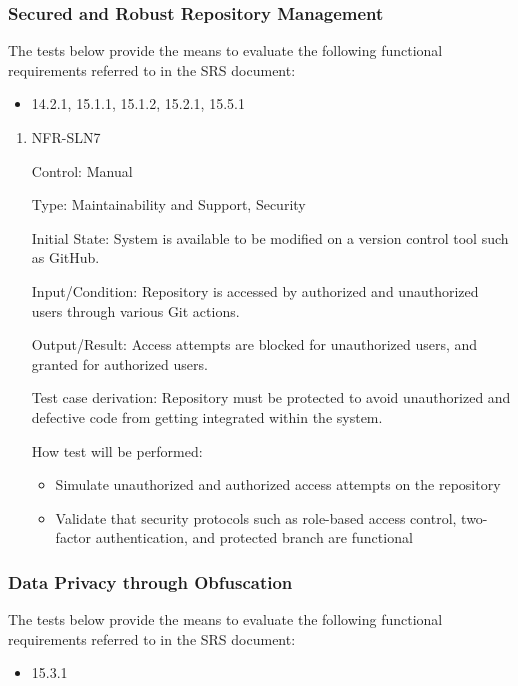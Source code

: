 \documentclass[12pt, titlepage]{article}
\begin{document}
\subsubsection{Secured and Robust Repository Management}

The tests below provide the means to evaluate the following functional requirements referred to in the SRS document:
\begin{itemize}
  \item 14.2.1, 15.1.1, 15.1.2, 15.2.1, 15.5.1
\end{itemize}

\begin{enumerate}
\item NFR-SLN7

Control: Manual

Type: Maintainability and Support, Security

Initial State: System is available to be modified on a version control tool such as GitHub.

Input/Condition: Repository is accessed by authorized and unauthorized users through various Git actions.

Output/Result: Access attempts are blocked for unauthorized users, and granted for authorized users.

Test case derivation: Repository must be protected to avoid unauthorized and defective code from getting integrated within the system.

How test will be performed:
\begin{itemize}
  \item Simulate unauthorized and authorized access attempts on the repository
  \item Validate that security protocols such as role-based access control, two-factor authentication, and protected branch are functional
\end{itemize}

\end{enumerate}

\subsubsection{Data Privacy through Obfuscation}

The tests below provide the means to evaluate the following functional requirements referred to in the SRS document:
\begin{itemize}
  \item 15.3.1
\end{itemize}
\end{document}

